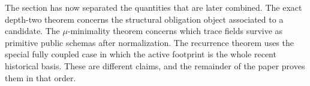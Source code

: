 The section has now separated the quantities that are later combined.  The exact
depth-two theorem concerns the structural obligation object associated to a candidate.  The
\(\mu\)-minimality theorem concerns which trace fields survive as primitive public schemas
after normalization.  The recurrence theorem uses the special fully coupled case in which the
active footprint is the whole recent historical basis.  These are different claims, and the
remainder of the paper proves them in that order.
